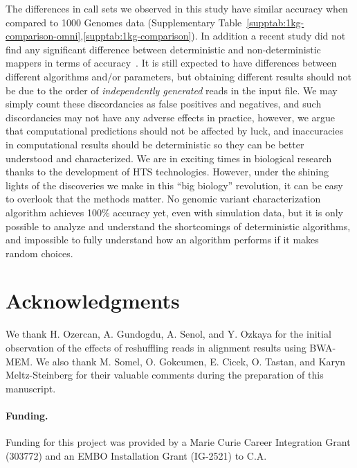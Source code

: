 \documentclass{bioinfo}
\begin{document}
The differences in call sets we observed in this study 
have similar accuracy when compared to 1000 Genomes data (Supplementary Table~\ref{supptab:1kg-comparison-omni},\ref{supptab:1kg-comparison}). In addition a recent study did not find any significant difference between deterministic and non-deterministic mappers in terms of accuracy~\citep{Cornish2015}.
It is still expected to 
have differences between different algorithms and/or parameters, but
obtaining different results should not be due to the order of {\it independently generated} reads in the input file. 
We may simply count these discordancies as false positives and negatives, and such discordancies may not have any adverse effects in practice, however, 
we argue that computational predictions should not be affected by luck, and inaccuracies in computational results should be deterministic so they can be better understood and characterized.
We are in exciting times in biological research thanks to the development of HTS technologies. However, under the shining lights of the discoveries we make in this ``big biology'' revolution,  
it can be easy to overlook that the methods matter.
No genomic variant characterization algorithm achieves 100\% accuracy yet, even with  simulation data, but it is only possible to analyze and understand the shortcomings of 
deterministic algorithms, and impossible to fully understand how an algorithm performs if it makes random choices. 

\vspace*{-0.75cm}

\section*{Acknowledgments}

We thank H. Ozercan, A. Gundogdu, A. Senol, and Y. Ozkaya for the initial observation of the effects of reshuffling reads in alignment results using BWA-MEM. We also thank M. Somel, 
O. Gokcumen, E. Cicek, O. Tastan, and Karyn Meltz-Steinberg for
their valuable comments during the preparation of this manuscript.

\paragraph{Funding.}
Funding for this project was provided by a Marie Curie Career Integration Grant (303772) and an 
EMBO Installation Grant (IG-2521) to C.A.

\vspace*{-0.75cm}

\footnotesize




\clearpage


\end{document}
